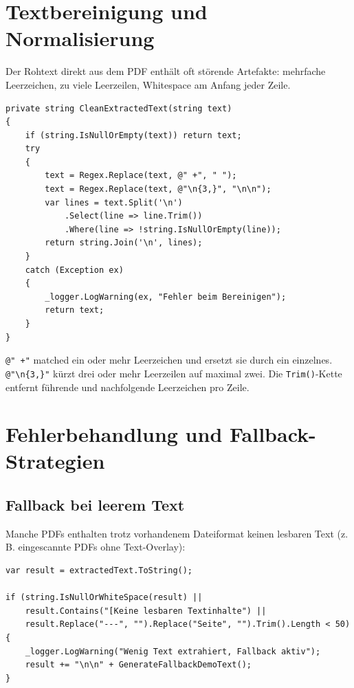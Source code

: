 \section{Textbereinigung und Normalisierung}
\label{sec:text_cleaning}

Der Rohtext direkt aus dem PDF enthält oft störende Artefakte: mehrfache Leerzeichen, zu viele Leerzeilen, Whitespace am Anfang jeder Zeile.

\begin{lstlisting}[language={[Sharp]C}, caption={Text-Bereinigung mit Regex}, label={lst:text_cleaning}]
private string CleanExtractedText(string text)
{
    if (string.IsNullOrEmpty(text)) return text;
    try
    {
        text = Regex.Replace(text, @" +", " ");
        text = Regex.Replace(text, @"\n{3,}", "\n\n");
        var lines = text.Split('\n')
            .Select(line => line.Trim())
            .Where(line => !string.IsNullOrEmpty(line));
        return string.Join('\n', lines);
    }
    catch (Exception ex)
    {
        _logger.LogWarning(ex, "Fehler beim Bereinigen");
        return text;
    }
}
\end{lstlisting}

\texttt{@" +"} matched ein oder mehr Leerzeichen und ersetzt sie durch ein einzelnes. \texttt{@"\textbackslash n\{3,\}"} kürzt drei oder mehr Leerzeilen auf maximal zwei. Die \texttt{Trim()}-Kette entfernt führende und nachfolgende Leerzeichen pro Zeile.

\section{Fehlerbehandlung und Fallback-Strategien}
\label{sec:pdf_fehlerbehandlung}

\subsection{Fallback bei leerem Text}

Manche PDFs enthalten trotz vorhandenem Dateiformat keinen lesbaren Text (z.\,B. eingescannte PDFs ohne Text-Overlay):

\begin{lstlisting}[language={[Sharp]C}, caption={Leertext-Erkennung}, label={lst:fallback_check}]
var result = extractedText.ToString();

if (string.IsNullOrWhiteSpace(result) || 
    result.Contains("[Keine lesbaren Textinhalte") ||
    result.Replace("---", "").Replace("Seite", "").Trim().Length < 50)
{
    _logger.LogWarning("Wenig Text extrahiert, Fallback aktiv");
    result += "\n\n" + GenerateFallbackDemoText();
}
\end{lstlisting}

